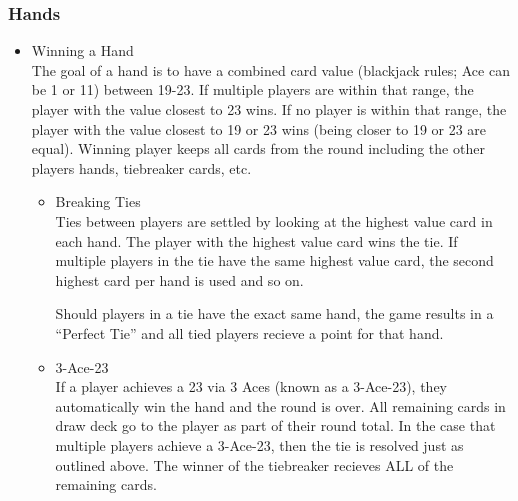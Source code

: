 \documentclass[11pt]{article}
\begin{document}
\subsubsection{Hands}
\label{sec-2-2-2}
\begin{itemize}

\item Winning a Hand\\
\label{sec-2-2-2-1}%
The goal of a hand is to have a combined card value (blackjack rules; 
Ace can be 1 or 11) between 19-23. If multiple players are within that 
range, the player with the value closest to 23 wins. If no player is 
within that range, the player with the value closest to 19 or 23 wins 
(being closer to 19 or 23 are equal). Winning player keeps all cards 
from the round including the other players hands, tiebreaker cards, etc. 

\begin{itemize}

\item Breaking Ties\\
\label{sec-2-2-2-1-1}%
Ties between players are settled by looking at the highest value card in 
each hand. The player with the highest value card wins the tie. If multiple 
players in the tie have the same highest value card, the second highest card 
per hand is used and so on. 

Should players in a tie have the exact same hand, the game results in a 
``Perfect Tie'' and all tied players recieve a point for that hand. 


\item 3-Ace-23\\
\label{sec-2-2-2-1-2}%
If a player achieves a 23 via 3 Aces (known as a 3-Ace-23), they
automatically win the hand and the round is over. All remaining cards in
draw deck go to the player as part of their round total. In the case that
multiple players achieve a 3-Ace-23, then the tie is resolved just as
outlined above. The winner of the tiebreaker recieves ALL of the
remaining cards.

\end{itemize} %


\end{itemize}
\end{document}
